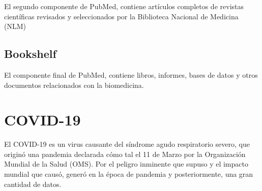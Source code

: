 El segundo componente de PubMed, contiene artículos completos de revistas científicas revisados y seleccionados por la Biblioteca Nacional de Medicina (NLM)
\subsection{Bookshelf}

El componente final de PubMed, contiene libros, informes, bases de datos y otros documentos relacionados con la biomedicina.

\cite{pubmed_1996}

\section{COVID-19}

El COVID-19 es un virus causante del síndrome agudo respiratorio severo, que originó una pandemia declarada cómo tal el 11 de Marzo por la Organización Mundial de la Salud (OMS). Por el peligro inminente que supuso y el impacto mundial que causó, generó en la época de pandemia y posteriormente, una gran cantidad de datos.

\cite{habas_resolution_2020}
